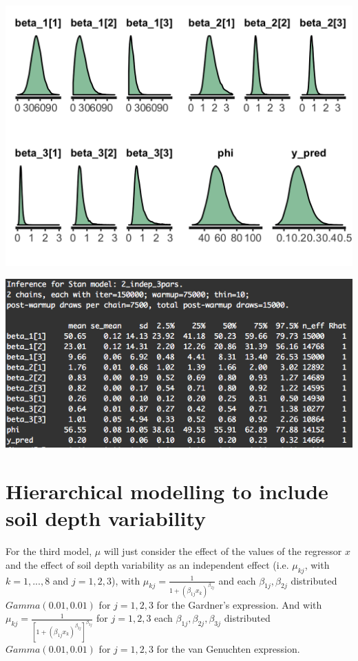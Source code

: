 \documentclass{article}
\begin{document}
\begin{minipage}{0.50\textwidth}
\includegraphics[width=\linewidth,]{indep_3pars_dens.png}
\end{minipage}
\begin{minipage}{0.50\textwidth}
\includegraphics[width=\linewidth]{p04.png}
\end{minipage}

\newpage
\section{Hierarchical modelling to include soil depth variability}
For the third model, $\mu$ will just consider the effect of the values of the regressor $x$ and the effect of soil depth variability as an independent effect (i.e. $\mu_{kj}$, with $k = 1,..., 8$ and $j = 1,2,3$), with $\mu_{kj} = \frac{1}{1+(\beta_{1j} x_k)^{\beta_{2j}}}$ and each $\beta_{1j}, \beta_{2j}$ distributed $Gamma(0.01, 0.01)$  for $j = 1,2,3$ for the Gardner’s expression. And with $\mu_{kj} = \frac{1}{[1+(\beta_{1j} x_k)^{\beta_{2j}}]^{\beta_{3j}}}$ for $j = 1,2,3$ each $\beta_{1j}, \beta_{2j}, \beta_{3j}$ distributed $Gamma(0.01, 0.01)$ for $j = 1,2,3$ for the van Genuchten expression.
\end{document}
